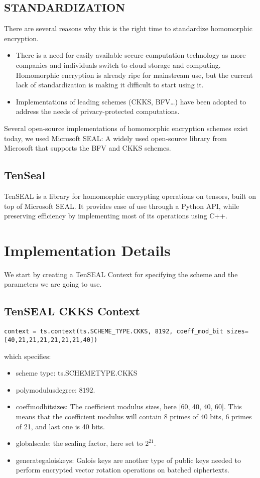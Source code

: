 \documentclass[11pt]{article}
\begin{document}
\subsection{STANDARDIZATION}
There are several reasons why this is the right time to standardize homomorphic encryption.

\begin{itemize}
\item There is a need for easily available secure computation technology as more companies and individuals switch to cloud storage and computing. Homomorphic encryption is already ripe for mainstream use, but the current lack of standardization is making it difficult to start using it.
\item Implementations of leading schemes (CKKS, BFV…) have been adopted to address the needs of privacy-protected computations.

\end{itemize}
Several open-source implementations of homomorphic encryption schemes exist today, we used Microsoft SEAL: A widely used open-source library from Microsoft that supports the BFV and CKKS schemes.

\subsection{TenSeal}
TenSEAL is a library for homomorphic encrypting operations on tensors, built on top of Microsoft SEAL. It provides ease of use through a Python API, while preserving efficiency by implementing most of its operations using C++.


\section{Implementation Details} 
We start by creating a TenSEAL Context for specifying the scheme and the parameters we are going to use.
\subsection{TenSEAL CKKS Context}
\begin{lstlisting}
context = ts.context(ts.SCHEME_TYPE.CKKS, 8192, coeff_mod_bit sizes=[40,21,21,21,21,21,21,40])
\end{lstlisting}
which specifies:
\begin{itemize}
  \item scheme type: ts.SCHEME\textunderscore TYPE.CKKS
  \item poly\textunderscore modulus\textunderscore degree: $8192$.
  \item coeff\textunderscore mod\textunderscore bit\textunderscore sizes: The coefficient modulus sizes, here [60, 40, 40, 60]. This means that the coefficient modulus will contain 8 primes of 40 bits, 6 primes of 21, and last one is 40 bits.
  \item global\textunderscore scale: the scaling factor, here set to $2^{21}$.
  \item generate\textunderscore galois\textunderscore keys: Galois keys are another type of public keys needed to perform encrypted vector rotation operations on batched ciphertexts.
 \end{itemize}
 
\end{document}
